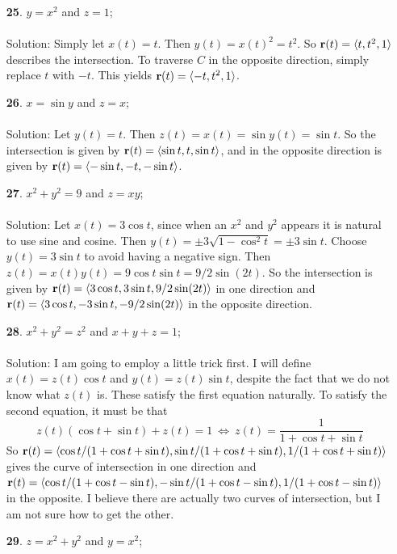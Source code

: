 \documentclass[12pt]{amsbook}
\newcommand{\la}{\langle}
\newcommand{\ra}{\rangle}
\begin{document}
\begin{enumerate}
  \item[{\small\bf 25}.] $y=x^2$ and $z=1$;
  \\
  \\
  {\sc Solution}: Simply let $x(t)=t$. Then $y(t)=x(t)^2=t^2$. So ${\bf r}(t)=\la t,t^2,1 \ra$ describes the intersection. To traverse $C$ in the opposite direction, simply replace $t$ with $-t$. This yields ${\bf r}(t)=\la -t, t^2, 1\ra$. 
  \\
  \item[{\small\bf 26}.] $x=\sin y$ and $z=x$; 
  \\
  \\
  {\sc Solution}: Let $y(t)=t$. Then $z(t)=x(t)=\sin y(t)=\sin t$. So the intersection is given by ${\bf r}(t)=\la \sin t, t, \sin t\ra$, and in the opposite direction is given by ${\bf r}(t)=\la -\sin t, -t, -\sin t \ra$. 
  \\
  \item[{\small\bf 27}.] $x^2+y^2=9$ and $z=xy$;
  \\
  \\
  {\sc Solution}: Let $x(t)=3\cos t$, since when an $x^2$ and $y^2$ appears it is natural to use sine and cosine. Then $y(t)=\pm 3\sqrt{1-\cos^2 t}=\pm 3\sin t$. Choose $y(t)=3\sin t$ to avoid having a negative sign. Then $z(t)=x(t)y(t)=9\cos t \sin t=9/2\sin(2t)$. So the intersection is given by ${\bf r}(t)=\la 3\cos t, 3\sin t, 9/2\sin (2t) \ra$ in one direction and ${\bf r}(t)=\la 3\cos t, -3\sin t, -9/2\sin (2t) \ra$ in the opposite direction.
  \\
  \item[{\small\bf 28}.] $x^2+y^2=z^2$ and $x+y+z=1$; 
  \\
  \\
  {\sc Solution}: I am going to employ a little trick first. I will define $x(t)=z(t)\cos t$ and $y(t)=z(t) \sin t$, despite the fact that we do not know what $z(t)$ is. These satisfy the first equation naturally. To satisfy the second equation, it must be that
  $$z(t)(\cos t + \sin t)+z(t)=1 \ \Leftrightarrow \ z(t)=\frac{1}{1+\cos t+\sin t}$$
  So ${\bf r}(t)=\la \cos t/(1+\cos t+\sin t), \sin t/(1+\cos t+\sin t), 1/(1+\cos t+\sin t) \ra$ gives the curve of intersection in one direction and ${\bf r}(t)=\la \cos t/(1+\cos t-\sin t), -\sin t/(1+\cos t-\sin t), 1/(1+\cos t-\sin t) \ra$ in the opposite. I believe there are actually two curves of intersection, but I am not sure how to get the other.
  \\
  \item[{\small\bf 29}.] $z=x^2+y^2$ and $y=x^2$;

\end{enumerate}
\end{document}
